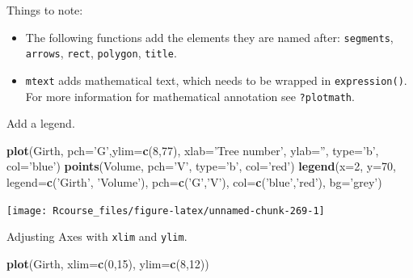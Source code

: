 \documentclass[]{book}
\newenvironment{Shaded}{\begin{snugshade}}{\end{snugshade}}
\newcommand{\KeywordTok}[1]{\textcolor[rgb]{0.13,0.29,0.53}{\textbf{#1}}}
\newcommand{\DataTypeTok}[1]{\textcolor[rgb]{0.13,0.29,0.53}{#1}}
\newcommand{\DecValTok}[1]{\textcolor[rgb]{0.00,0.00,0.81}{#1}}
\newcommand{\StringTok}[1]{\textcolor[rgb]{0.31,0.60,0.02}{#1}}
\newcommand{\NormalTok}[1]{#1}
\providecommand{\tightlist}{%
  \setlength{\itemsep}{0pt}\setlength{\parskip}{0pt}}
\theoremstyle{definition}
\theoremstyle{definition}
\theoremstyle{definition}
\theoremstyle{remark}
\begin{document}
Things to note:

\begin{itemize}
\tightlist
\item
  The following functions add the elements they are named after:
  \texttt{segments}, \texttt{arrows}, \texttt{rect}, \texttt{polygon},
  \texttt{title}.
\item
  \texttt{mtext} adds mathematical text, which needs to be wrapped in
  \texttt{expression()}. For more information for mathematical
  annotation see \texttt{?plotmath}.
\end{itemize}

Add a legend.

\begin{Shaded}
\begin{Highlighting}[]
\KeywordTok{plot}\NormalTok{(Girth, }\DataTypeTok{pch=}\StringTok{'G'}\NormalTok{,}\DataTypeTok{ylim=}\KeywordTok{c}\NormalTok{(}\DecValTok{8}\NormalTok{,}\DecValTok{77}\NormalTok{), }\DataTypeTok{xlab=}\StringTok{'Tree number'}\NormalTok{, }\DataTypeTok{ylab=}\StringTok{''}\NormalTok{, }\DataTypeTok{type=}\StringTok{'b'}\NormalTok{, }\DataTypeTok{col=}\StringTok{'blue'}\NormalTok{)}
\KeywordTok{points}\NormalTok{(Volume, }\DataTypeTok{pch=}\StringTok{'V'}\NormalTok{, }\DataTypeTok{type=}\StringTok{'b'}\NormalTok{, }\DataTypeTok{col=}\StringTok{'red'}\NormalTok{)}
\KeywordTok{legend}\NormalTok{(}\DataTypeTok{x=}\DecValTok{2}\NormalTok{, }\DataTypeTok{y=}\DecValTok{70}\NormalTok{, }\DataTypeTok{legend=}\KeywordTok{c}\NormalTok{(}\StringTok{'Girth'}\NormalTok{, }\StringTok{'Volume'}\NormalTok{), }\DataTypeTok{pch=}\KeywordTok{c}\NormalTok{(}\StringTok{'G'}\NormalTok{,}\StringTok{'V'}\NormalTok{), }\DataTypeTok{col=}\KeywordTok{c}\NormalTok{(}\StringTok{'blue'}\NormalTok{,}\StringTok{'red'}\NormalTok{), }\DataTypeTok{bg=}\StringTok{'grey'}\NormalTok{)}
\end{Highlighting}
\end{Shaded}

\texttt{[image: Rcourse\_files/figure-latex/unnamed-chunk-269-1]}

Adjusting Axes with \texttt{xlim} and \texttt{ylim}.

\begin{Shaded}
\begin{Highlighting}[]
\KeywordTok{plot}\NormalTok{(Girth, }\DataTypeTok{xlim=}\KeywordTok{c}\NormalTok{(}\DecValTok{0}\NormalTok{,}\DecValTok{15}\NormalTok{), }\DataTypeTok{ylim=}\KeywordTok{c}\NormalTok{(}\DecValTok{8}\NormalTok{,}\DecValTok{12}\NormalTok{))}
\end{Highlighting}
\end{Shaded}
\end{document}

